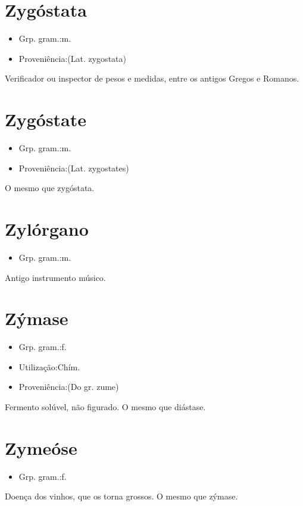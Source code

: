 \section{Zygóstata}
\begin{itemize}
\item {Grp. gram.:m.}
\end{itemize}
\begin{itemize}
\item {Proveniência:(Lat. \textunderscore zygostata\textunderscore )}
\end{itemize}
Verificador ou inspector de pesos e medidas, entre os antigos Gregos e Romanos.
\section{Zygóstate}
\begin{itemize}
\item {Grp. gram.:m.}
\end{itemize}
\begin{itemize}
\item {Proveniência:(Lat. \textunderscore zygostates\textunderscore )}
\end{itemize}
O mesmo que \textunderscore zygóstata\textunderscore .
\section{Zylórgano}
\begin{itemize}
\item {Grp. gram.:m.}
\end{itemize}
Antigo instrumento músico.
\section{Zýmase}
\begin{itemize}
\item {Grp. gram.:f.}
\end{itemize}
\begin{itemize}
\item {Utilização:Chím.}
\end{itemize}
\begin{itemize}
\item {Proveniência:(Do gr. \textunderscore zume\textunderscore )}
\end{itemize}
Fermento solúvel, não figurado.
O mesmo que \textunderscore diástase\textunderscore .
\section{Zymeóse}
\begin{itemize}
\item {Grp. gram.:f.}
\end{itemize}
Doença dos vinhos, que os torna grossos.
O mesmo que \textunderscore zýmase\textunderscore .

